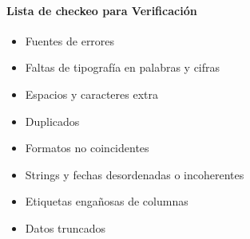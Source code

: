 \paragraph{Lista de checkeo para Verificación}
\begin{itemize}
    \item {Fuentes de errores}
    \item {Faltas de tipografía en palabras y cifras}
    \item {Espacios y caracteres extra}
    \item {Duplicados}
    \item {Formatos no coincidentes}
    \item {Strings y fechas desordenadas o incoherentes}
    \item {Etiquetas engañosas de columnas}
    \item {Datos truncados}
\end{itemize}


\newpage